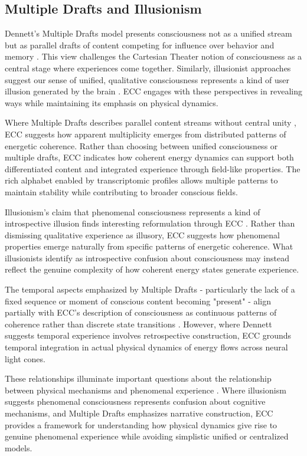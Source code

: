 \begin{refsection}
\section{Multiple Drafts and Illusionism}

Dennett's Multiple Drafts model presents consciousness not as a unified stream but as parallel drafts of content competing for influence over behavior and memory \cite{Dennett1991}. This view challenges the Cartesian Theater notion of consciousness as a central stage where experiences come together. Similarly, illusionist approaches suggest our sense of unified, qualitative consciousness represents a kind of user illusion generated by the brain \cite{Dennett2016}. ECC engages with these perspectives in revealing ways while maintaining its emphasis on physical dynamics.

Where Multiple Drafts describes parallel content streams without central unity \cite{Dennett1992}, ECC suggests how apparent multiplicity emerges from distributed patterns of energetic coherence. Rather than choosing between unified consciousness or multiple drafts, ECC indicates how coherent energy dynamics can support both differentiated content and integrated experience through field-like properties. The rich alphabet enabled by transcriptomic profiles allows multiple patterns to maintain stability while contributing to broader conscious fields.

Illusionism's claim that phenomenal consciousness represents a kind of introspective illusion finds interesting reformulation through ECC \cite{Frankish2016}. Rather than dismissing qualitative experience as illusory, ECC suggests how phenomenal properties emerge naturally from specific patterns of energetic coherence. What illusionists identify as introspective confusion about consciousness may instead reflect the genuine complexity of how coherent energy states generate experience.

The temporal aspects emphasized by Multiple Drafts - particularly the lack of a fixed sequence or moment of conscious content becoming "present" - align partially with ECC's description of consciousness as continuous patterns of coherence rather than discrete state transitions \cite{Blackmore2002}. However, where Dennett suggests temporal experience involves retrospective construction, ECC grounds temporal integration in actual physical dynamics of energy flows across neural light cones.

These relationships illuminate important questions about the relationship between physical mechanisms and phenomenal experience \cite{Pereboom2011}. Where illusionism suggests phenomenal consciousness represents confusion about cognitive mechanisms, and Multiple Drafts emphasizes narrative construction, ECC provides a framework for understanding how physical dynamics give rise to genuine phenomenal experience while avoiding simplistic unified or centralized models.


\end{refsection}
